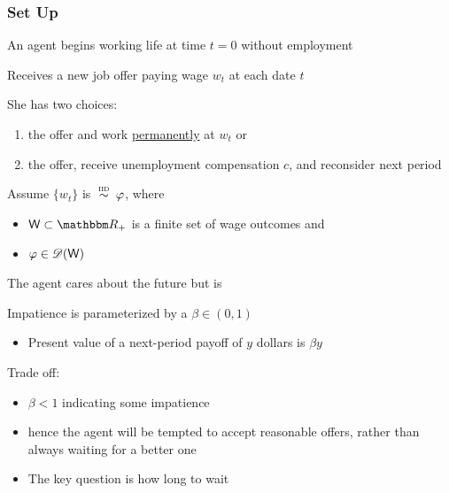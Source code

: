 \begin{frame}
    \frametitle{Set Up}
    
    An agent begins working life at time $t=0$ without employment  

            \vspace{0.5em}
    Receives a new job offer paying wage $w_t$ at each date $t$  
            \vspace{0.5em}

    She has two choices:
    \begin{enumerate}
        \item {} the offer and work \underline{permanently} at $w_t$ or
            \vspace{0.5em}
        \item {} the offer, receive unemployment compensation $c$, and reconsider next period
    \end{enumerate}

            \vspace{0.5em}
    Assume $\{w_t\}$ is $\stackrel{\textrm{ {\sc iid }}} {\sim} \varphi$, where
    \begin{itemize}
        \item $\Wsf \subset \RR_+$ is a finite set of wage outcomes and
            \vspace{0.5em}
        \item $\varphi \in \mathscr D(\mathsf W)$
    \end{itemize}

\end{frame}



\begin{frame}

    The agent cares about the future but is 

            \vspace{0.5em}
    Impatience is parameterized by a  $\beta \in (0, 1)$

            \vspace{0.5em}
    \begin{itemize}
        \item Present value of a next-period payoff of $y$ dollars is $\beta y$
    \end{itemize}

            \vspace{0.5em}
            \vspace{0.5em}
    Trade off:
    \begin{itemize}
        \item $\beta < 1$ indicating some impatience
            \vspace{0.5em}
        \item hence the agent will be
            tempted to accept reasonable offers, rather than always waiting
            for a better one
            \vspace{0.5em}
        \item The key question is how long to wait
    \end{itemize}
   
\end{frame}



